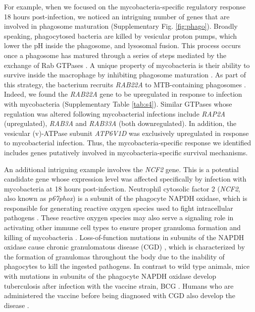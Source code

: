 For example, when we focused on the mycobacteria-specific regulatory
response 18 hours post-infection, we noticed an intriguing number of
genes that are involved in phagosome maturation (Supplementary Fig. \ref{fig:phago}). Broadly speaking, phagocytosed bacteria are killed by vesicular
proton pumps, which lower the pH inside the phagosome, and lysosomal
fusion. This process occurs once a phagosome has matured through a
series of steps mediated by the exchange of Rab GTPases \citep{Vergne2004,
Mortellaro2009}. A unique property of mycobacteria is their ability
to survive inside the macrophage by inhibiting phagosome maturation
\citep{Hestvik2005}. As part of this strategy, the bacterium recruits
\emph{RAB22A} to MTB-containing phagosomes \citep{Roberts2006}. Indeed,
we found the \emph{RAB22A} gene to be upregulated in response to
infection with mycobacteria (Supplementary Table \ref{tab:s4}). Similar GTPases
whose regulation was altered following mycobacterial infections include
\emph{RAP2A} (upregulated), \emph{RAB3A} and \emph{RAB33A} (both
downregulated). In addition, the vesicular (v)-ATPase subunit
\emph{ATP6V1D} was exclusively upregulated in response to mycobacterial
infection. Thus, the mycobacteria-specific response we identified
includes genes putatively involved in mycobacteria-specific survival
mechanisms.

An additional intriguing example involves the \emph{NCF2} gene. This is
a potential candidate gene whose expression level was affected
specifically by infection with mycobacteria at 18 hours post-infection.
Neutrophil cytosolic factor 2 (\emph{NCF2}, also known as
\emph{p67phox}) is a subunit of the phagocyte NAPDH oxidase, which is
responsible for generating reactive oxygen species used to fight
intracellular pathogens \citep{Ehrt2001, Myers2003, Babior2004,
Bustamante2011, Kim2011c, Deffert2014}. These reactive oxygen
species may also serve a signaling role in activating other immune cell
types to ensure proper granuloma formation and killing of mycobacteria
\citep{Deffert2014a}. Loss-of-function mutations in subunits of the NAPDH
oxidase cause chronic granulomatous disease (CGD) \citep{Deffert2014},
which is characterized by the formation of granulomas throughout the
body due to the inability of phagocytes to kill the ingested pathogens.
In contrast to wild type animals, mice with mutations in subunits of the
phagocyte NAPDH oxidase develop tuberculosis after infection with the
vaccine strain, BCG \citep{Deffert2014a}. Humans who are administered the
vaccine before being diagnosed with CGD also develop the disease
\citep{Deffert2014}.

